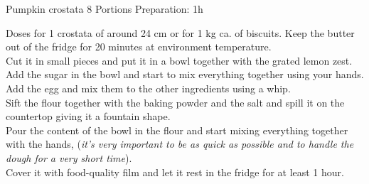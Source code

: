 \documentclass{book}
\begin{document}
    \begin{recipe}{Pumpkin crostata} {8 Portions} {Preparation: 1h}
        
        \freeform Doses for 1 crostata of around 24 cm or for 1 kg ca. of biscuits.
        Keep the butter out of the fridge for 20 minutes at environment temperature.\\
        Cut it in small pieces and put it in a bowl together with the grated lemon zest.\\
        Add the sugar in the bowl and start to mix everything together using your hands.\\
        Add the egg and mix them to the other ingredients using a whip.\\
        Sift the flour together with the baking powder and the salt and spill it on the countertop giving it a fountain shape.\\
        Pour the content of the bowl in the flour and start mixing everything together with the hands,
        (\textit{it's very important to be as quick as possible and to handle the dough for a very short time}).\\
        Cover it with food-quality film and let it rest in the fridge for at least 1 hour.

        
    \end{recipe}
\end{document}
